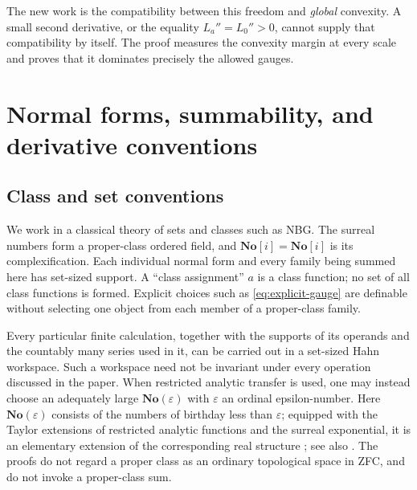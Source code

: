 \documentclass[11pt,letterpaper]{article}
\numberwithin{equation}{section}
\theoremstyle{plain}
\theoremstyle{definition}
\theoremstyle{remark}
\newcommand{\No}{\mathbf{No}}
\newcommand{\SC}{\mathbf{No}[i]}
\begin{document}
The new work is the compatibility between this freedom and \emph{global}
convexity. A small second derivative, or the equality $L_a''=L_0''>0$, cannot
supply that compatibility by itself. The proof measures the convexity margin
at every scale and proves that it dominates precisely the allowed gauges.

\section{Normal forms, summability, and derivative conventions}
\label{sec:preliminaries}

\subsection{Class and set conventions}
We work in a classical theory of sets and classes such as NBG. The surreal
numbers form a proper-class ordered field, and $\SC=\No[i]$ is its
complexification. Each individual normal form and every family being summed
here has set-sized support. A ``class assignment'' $a$ is a class function;
no set of all class functions is formed. Explicit choices such as
\eqref{eq:explicit-gauge} are definable without selecting one object from
each member of a proper-class family.

Every particular finite calculation, together with the supports of its
operands and the countably many series used in it, can be carried out in a
set-sized Hahn workspace. Such a workspace need not be invariant under every
operation discussed in the paper. When restricted analytic transfer is used,
one may instead choose an adequately large $\No(\varepsilon)$ with
$\varepsilon$ an ordinal epsilon-number. Here $\No(\varepsilon)$ consists
of the numbers of birthday less than $\varepsilon$; equipped with the
Taylor extensions of restricted analytic functions and the surreal
exponential, it is an elementary extension of the corresponding real
structure \cite[Prop.~4.7]{vdDE}; see also \cite[Prop.~93]{CE}.
The proofs do not regard a proper class as an ordinary topological space in
ZFC, and do not invoke a proper-class sum.
\end{document}
